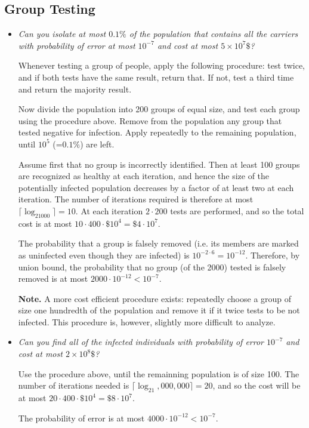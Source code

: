 \documentclass[11pt]{article} \usepackage{amssymb}
\begin{document}
\subsection{Group Testing}
\begin{itemize}
\item
{\em Can you isolate at most $0.1\%$ of the population that contains all the carriers with probability of error at most $10^{-7}$ 
and cost at most $5 \times 10^{7}\$$?}

Whenever testing a group of people, apply the following procedure: test twice,
and if both tests have the same result, return that. If not, test a third time
and return the majority result.

Now divide the population into 200 groups of equal size, and test each group 
using the procedure above. Remove from the population any group that tested 
negative for infection. Apply repeatedly to the remaining population, until 
$10^5$ (=$0.1\%$) are left.

Assume first that no group is incorrectly identified. Then at least 100 groups 
are recognized as healthy at each iteration, and hence the size of the 
potentially infected population decreases by a factor of at least two at each
iteration. The number of iterations required is therefore at most
$\lceil\log_21000\rceil=10$. At each iteration $2\cdot200$ tests are performed,
and so the total cost is at most $10\cdot400\cdot\$10^4=\$4\cdot10^7$.

The probability that a group is falsely removed (i.e. its members are marked
as uninfected even though they are infected) is $10^{-2\cdot6}=10^{-12}$. 
Therefore, by union bound, the probability that no group (of the 2000) tested
is falsely removed is at most $2000\cdot 10^{-12}<10^{-7}$.

{\bf Note.} A more cost efficient procedure exists: repeatedly choose a group of
size one hundredth of the population and remove it if it twice tests to be
not infected. This procedure is, however, slightly more difficult to analyze.


\item
{\em Can you find all of the infected individuals with probability of error 
$10^{-7}$
and cost at most $2 \times 10^{8}\$$?}

Use the procedure above, until the remainning population is of size 100. The
number of iterations needed is $\lceil\log_21,000,000\rceil=20$, and so the cost will be
at most $20\cdot 400 \cdot \$10^4=\$8\cdot 10^7$.

The probability of error is at most $4000\cdot 10^{-12}<10^{-7}$.
\end{itemize}
\end{document}
